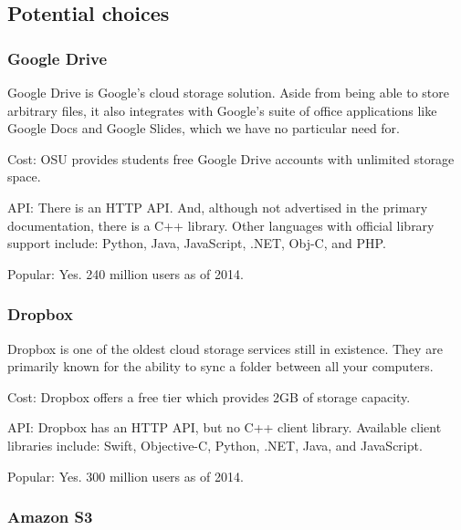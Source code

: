 \subsection{ Potential choices }
\subsubsection{ Google Drive }

Google Drive is Google's cloud storage solution. Aside from being able to store arbitrary files, it also integrates with Google's suite of office applications like Google Docs and Google Slides, which we have no particular need for.

Cost: OSU provides students free Google Drive accounts with unlimited storage space.

API: There is an HTTP API.
And, although not advertised in the primary documentation, there is a C++ library. \cite{drivecpp}
Other languages with official library support include:  Python, Java, JavaScript, .NET, Obj-C, and PHP.
\cite{driveapi}

Popular: Yes. 240 million users as of 2014. \cite{fortune}

\subsubsection{ Dropbox }

Dropbox \cite{dropbox} is one of the oldest cloud storage services still in existence. They are primarily known for the ability to sync a folder between all your computers.

Cost: Dropbox offers a free tier which provides 2GB of storage capacity.
\cite{dropboxplans}

API: Dropbox has an HTTP API,
\cite{dropboxapi}
but no C++ client library.
Available client libraries include:
Swift, Objective-C, Python, .NET, Java, and JavaScript.




Popular: Yes. 300 million users as of 2014. \cite{fortune}

\subsubsection{ Amazon S3 }

